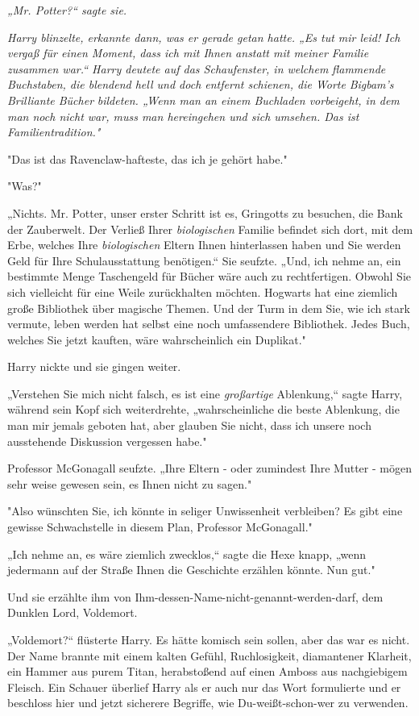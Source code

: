 {\emph{„Mr. Potter?“ sagte sie.}

\emph{Harry blinzelte, erkannte dann, was er gerade getan hatte. „Es tut mir leid! Ich vergaß für einen Moment, dass ich mit Ihnen anstatt mit meiner Familie zusammen war.“ Harry deutete auf das Schaufenster, in welchem} \emph{flammende Buchstaben, die blendend hell und doch entfernt schienen, die Worte} \emph{\emph{Bigbam's Brilliante Bücher}} \emph{bildeten. „Wenn man an einem Buchladen vorbeigeht, in dem man noch nicht war, muss man hereingehen und sich umsehen. Das ist Familientradition."}

"Das ist das Ravenclaw-hafteste, das ich je gehört habe."

"Was?"

„Nichts. Mr. Potter, unser erster Schritt ist es, Gringotts zu besuchen, die Bank der Zauberwelt. Der Verließ Ihrer \emph{biologischen} Familie befindet sich dort, mit dem Erbe, welches Ihre \emph{biologischen} Eltern Ihnen hinterlassen haben und Sie werden Geld für Ihre Schulausstattung benötigen.“ Sie seufzte. „Und, ich nehme an, ein bestimmte Menge Taschengeld für Bücher wäre auch zu rechtfertigen. Obwohl Sie sich vielleicht für eine Weile zurückhalten möchten. Hogwarts hat eine ziemlich große Bibliothek über magische Themen. Und der Turm in dem Sie, wie ich stark vermute, leben werden hat selbst eine noch umfassendere Bibliothek. Jedes Buch, welches Sie jetzt kauften, wäre wahrscheinlich ein Duplikat."

Harry nickte und sie gingen weiter.

„Verstehen Sie mich nicht falsch, es ist eine \emph{großartige} Ablenkung,“ sagte Harry, während sein Kopf sich weiterdrehte, „wahrscheinliche die beste Ablenkung, die man mir jemals geboten hat, aber glauben Sie nicht, dass ich unsere noch ausstehende Diskussion vergessen habe."

Professor McGonagall seufzte. „Ihre Eltern - oder zumindest Ihre Mutter - mögen sehr weise gewesen sein, es Ihnen nicht zu sagen."

"Also wünschten Sie, ich könnte in seliger Unwissenheit verbleiben? Es gibt eine gewisse Schwachstelle in diesem Plan, Professor McGonagall."

„Ich nehme an, es wäre ziemlich zwecklos,“ sagte die Hexe knapp, „wenn jedermann auf der Straße Ihnen die Geschichte erzählen könnte. Nun gut."

Und sie erzählte ihm von Ihm-dessen-Name-nicht-genannt-werden-darf, dem Dunklen Lord, Voldemort.

„Voldemort?“ flüsterte Harry. Es hätte komisch sein sollen, aber das war es nicht. Der Name brannte mit einem kalten Gefühl, Ruchlosigkeit, diamantener Klarheit, ein Hammer aus purem Titan, herabstoßend auf einen Amboss aus nachgiebigem Fleisch. Ein Schauer überlief Harry als er auch nur das Wort formulierte und er beschloss hier und jetzt sicherere Begriffe, wie Du-weißt-schon-wer zu verwenden.

}
